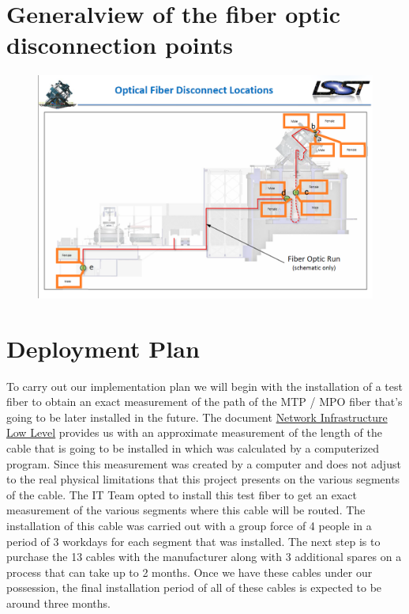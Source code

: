 \section{Generalview of the fiber optic disconnection points}
\label{sec:disconnectpoints}
\vspace{30 mm}
\begin{figure}
  \centering
  \includegraphics[width=17cm]{images/33333.png}
\end{figure}

\newpage

\section{Deployment Plan}

To carry out our implementation plan we will begin with the installation of a test fiber to obtain an exact measurement of the path of the MTP / MPO fiber that's going to be later installed in the future. The document \href{https://confluence.lsstcorp.org/display/IT/Network+Infrastructure+Low-Level+Design+LLD?preview=/139036736/140285500/Telescope-Camera%20Optical%20Fibers%20layout%20v3.pdf}{Network Infrastructure Low Level} provides us with an approximate measurement of the length of the cable that is going to be installed in which was calculated by a computerized program. Since this measurement was created by a computer and does not adjust to the real physical limitations that this project presents on the various segments of the cable. The IT Team opted to install this test fiber to get an exact measurement of the various segments where this cable will be routed.
The installation of this cable was carried out with a group force of 4 people in a period of 3 workdays for each segment that was installed. The next step is to purchase the 13 cables with the manufacturer along with 3 additional spares on a process that can take up to 2 months. Once we have these cables under our possession, the final installation period of all of these cables is expected to be around three months.

